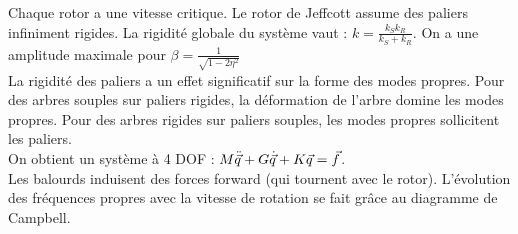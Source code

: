 \documentclass[../main.tex]{subfiles}
\begin{document}
Chaque rotor a une vitesse critique. Le rotor de Jeffcott assume des paliers infiniment rigides. La rigidité globale du système vaut : $k = \frac{k_S k_R}{ k_S + k_R}$. On a une amplitude maximale pour $\beta = \frac{1}{\sqrt{1-2\eta^2}}$\\
La rigidité des paliers a un effet significatif sur la forme des modes propres. Pour des arbres souples sur paliers rigides, la déformation de l'arbre domine les modes propres. Pour des arbres rigides sur paliers souples, les modes propres sollicitent les paliers.\\

On obtient un système à 4 DOF : $M\Ddot{\Vec{q}} + G\dot{\Vec{q}} + K\Vec{q} = \Vec{f}$.\\

Les balourds induisent des forces forward (qui tournent avec le rotor). L'évolution des fréquences propres avec la vitesse de rotation se fait grâce au diagramme de Campbell.\\
\end{document}
